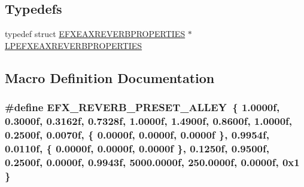 \subsection*{Typedefs}
\begin{DoxyCompactItemize}
\item 
typedef struct \hyperlink{struct_e_f_x_e_a_x_r_e_v_e_r_b_p_r_o_p_e_r_t_i_e_s}{E\+F\+X\+E\+A\+X\+R\+E\+V\+E\+R\+B\+P\+R\+O\+P\+E\+R\+T\+I\+ES} $\ast$ \hyperlink{efx-presets_8h_adc46e4b6e623551dd7ef8b35f268461d}{L\+P\+E\+F\+X\+E\+A\+X\+R\+E\+V\+E\+R\+B\+P\+R\+O\+P\+E\+R\+T\+I\+ES}
\end{DoxyCompactItemize}


\subsection{Macro Definition Documentation}
\subsubsection[{\texorpdfstring{E\+F\+X\+\_\+\+R\+E\+V\+E\+R\+B\+\_\+\+P\+R\+E\+S\+E\+T\+\_\+\+A\+L\+L\+EY}{EFX_REVERB_PRESET_ALLEY}}]{\setlength{\rightskip}{0pt plus 5cm}\#define E\+F\+X\+\_\+\+R\+E\+V\+E\+R\+B\+\_\+\+P\+R\+E\+S\+E\+T\+\_\+\+A\+L\+L\+EY~\{ 1.\+0000f, 0.\+3000f, 0.\+3162f, 0.\+7328f, 1.\+0000f, 1.\+4900f, 0.\+8600f, 1.\+0000f, 0.\+2500f, 0.\+0070f, \{ 0.\+0000f, 0.\+0000f, 0.\+0000f \}, 0.\+9954f, 0.\+0110f, \{ 0.\+0000f, 0.\+0000f, 0.\+0000f \}, 0.\+1250f, 0.\+9500f, 0.\+2500f, 0.\+0000f, 0.\+9943f, 5000.\+0000f, 250.\+0000f, 0.\+0000f, 0x1 \}}\hypertarget{efx-presets_8h_a9d007a740c938eb36c9bc66020999706}{}\label{efx-presets_8h_a9d007a740c938eb36c9bc66020999706}
